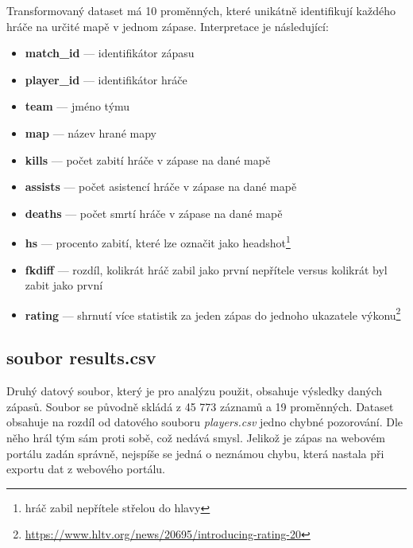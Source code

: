 \newpage
Transformovaný dataset má 10 proměnných, které unikátně identifikují každého hráče na určité mapě v jednom zápase. Interpretace je následující:
\begin{itemize}
    \item \textbf{match\_id} --- identifikátor zápasu
    \item \textbf{player\_id} --- identifikátor hráče
    \item \textbf{team} --- jméno týmu
    \item \textbf{map} --- název hrané mapy
    \item \textbf{kills} --- počet zabití hráče v zápase na dané mapě
    \item \textbf{assists} --- počet asistencí hráče v zápase na dané mapě
    \item \textbf{deaths} --- počet smrtí hráče v zápase na dané mapě
    \item \textbf{hs} --- procento zabití, které lze označit jako headshot\footnote{hráč zabil nepřítele střelou do hlavy}
    \item \textbf{fkdiff} --- rozdíl, kolikrát hráč zabil jako první nepřítele versus kolikrát byl zabit jako první
    \item \textbf{rating} --- shrnutí více statistik za jeden zápas do jednoho ukazatele výkonu\footnote{\url{https://www.hltv.org/news/20695/introducing-rating-20}}
\end{itemize}

\subsection{soubor results.csv}
Druhý datový soubor, který je pro analýzu použit, obsahuje výsledky daných zápasů. Soubor se původně skládá z 45 773 záznamů a 19 proměnných. Dataset obsahuje na rozdíl
od datového souboru \textit{players.csv} jedno chybné pozorování. Dle něho hrál tým sám proti sobě, což nedává smysl. Jelikož je zápas na webovém portálu zadán
správně, nejspíše se jedná o neznámou chybu, která nastala při exportu dat z webového portálu.

